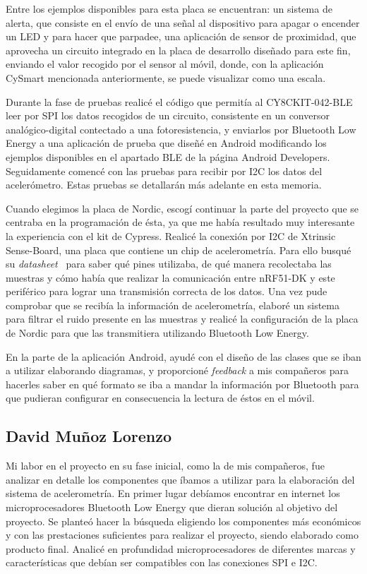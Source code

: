 Entre los ejemplos disponibles para esta placa se encuentran: un sistema de alerta, que consiste en el envío de una señal al dispositivo para apagar o encender un LED y para hacer que parpadee, una aplicación de sensor de proximidad, que aprovecha un circuito integrado en la placa de desarrollo diseñado para este fin, enviando el valor recogido por el sensor al móvil, donde, con la aplicación CySmart mencionada anteriormente, se puede visualizar como una escala.

Durante la fase de pruebas realicé el código que permitía al CY8CKIT-042-BLE leer por SPI los datos recogidos de un circuito, consistente en un conversor analógico-digital contectado a una fotoresistencia, y enviarlos por Bluetooth Low Energy a una aplicación de prueba que diseñé en Android modificando los ejemplos disponibles en el apartado BLE de la página Android Developers. Seguidamente comencé con las pruebas para recibir por I2C los datos del acelerómetro. Estas pruebas se detallarán más adelante en esta memoria.

Cuando elegimos la placa de Nordic, escogí continuar la parte del proyecto que se centraba en la programación de ésta, ya que me había resultado muy interesante la experiencia con el kit de Cypress. Realicé la conexión por I2C de Xtrinsic Sense-Board, una placa que contiene un chip de acelerometría. Para ello busqué su \textit{datasheet}~\cite{DatasheetAcc} para saber qué pines utilizaba, de qué manera recolectaba las muestras y cómo había que realizar la comunicación entre nRF51-DK y este periférico para lograr una transmisión correcta de los datos. Una vez pude comprobar que se recibía la información de acelerometría, elaboré un sistema para filtrar el ruido presente en las muestras y realicé la configuración de la placa de Nordic para que las transmitiera utilizando Bluetooth Low Energy.

En la parte de la aplicación Android, ayudé con el diseño de las clases que se iban a utilizar elaborando diagramas, y proporcioné \textit{feedback} a mis compañeros para hacerles saber en qué formato se iba a mandar la información por Bluetooth para que pudieran configurar en consecuencia la lectura de éstos en el móvil.

\subsection{David Muñoz Lorenzo}

Mi labor en el proyecto en su fase inicial, como la de mis compañeros, fue analizar en detalle los componentes que íbamos a utilizar para la elaboración del sistema de acelerometría. En primer lugar debíamos encontrar en internet los microprocesadores Bluetooth Low Energy que dieran solución al objetivo del proyecto.
Se planteó hacer la búsqueda eligiendo los componentes más económicos y con las prestaciones suficientes para realizar el proyecto, siendo elaborado como producto final. Analicé en profundidad microprocesadores de diferentes marcas y características que debían ser compatibles con las conexiones SPI e I2C.

